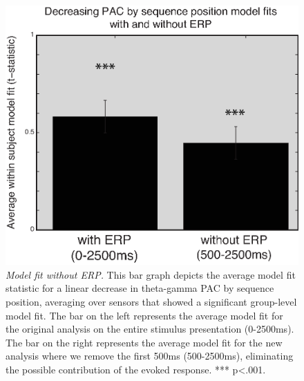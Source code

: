 \begin{figure}
  \centering
  \includegraphics[width=.75\textwidth]{figures/chapter3_suppfigure9.eps}
  \caption[Model fit without ERP]{\textit{Model fit without ERP.} This bar graph depicts the average model fit statistic for a linear decrease in theta-gamma PAC by sequence position, averaging over sensors that showed a significant group-level model fit.  The bar on the left represents the average model fit for the original analysis on the entire stimulus presentation (0-2500ms).  The bar on the right represents the average model fit for the new analysis where we remove the first 500ms (500-2500ms), eliminating the possible contribution of the evoked response.  *** p<.001.}
  \label{chapter3_suppfigure9}
\end{figure}

